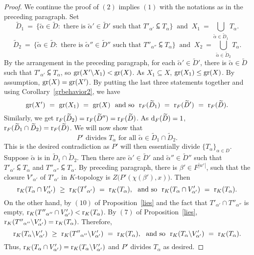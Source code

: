 \begin{proof}
We continue the proof of $(2)$ implies $(1)$ with the notations as in the preceding paragraph. 
Set
$$\widetilde{D}_1\  =\ \{ \tilde{\alpha} \in \widetilde{D} : \text{ there is } \tilde{\alpha}' \in \widetilde{D}' \text{ such that } T'_{\alpha'}\subsim T_\alpha \}\ \text{ and }\ X_1\ =\ \bigcup_{\tilde{\alpha} \in \widetilde{D}_1} T_\alpha. $$
$$\widetilde{D}_2\  =\ \{ \tilde{\alpha} \in \widetilde{D} : \text{ there is } \tilde{\alpha}'' \in \widetilde{D}'' \text{ such that } T''_{\alpha''}\subsim T_\alpha \}\ \text{ and }\ X_2\ =\ \bigcup_{\tilde{\alpha} \in \widetilde{D}_2} T_\alpha. $$
By the arrangement in the preceding paragraph, for each $\tilde{\alpha}' \in \widetilde{D}'$, there is $\tilde{\alpha} \in \widetilde{D}$ such that ${T'}_{\alpha'} \subsim T_\alpha$, so $\mathrm{gr}( X' \backslash X_1) < \mathrm{gr}(X)$. 
 As $X_1 \subseteq X $, $\mathrm{gr}(X_1) \leq \mathrm{gr}(X)$. By assumption, $\mathrm{gr}(X) =\mathrm{gr}(X')$. By putting the last three statements together and using Corollary~\ref{grbehavior2}, we have 
$$\gr( X')\ =\ \gr(X_1)\ =\ \gr(X)\ \text{ and so }\ \mr_F(\widetilde{D}_1)\ =\ \mr_F(\widetilde{D}')\ =\ \mr_F(\widetilde{D}).$$
Similarly, we get $\mathrm{r}_F(\widetilde{D}_2) =\mathrm{r}_F(\widetilde{D}'')=\mathrm{r}_F(\widetilde{D}) $.
As  $\mathrm{d}_F(\widetilde{D})=1$, $\mathrm{r}_F(\widetilde{D}_1 \cap \widetilde{D}_2) = \mathrm{r}_F(\widetilde{D}) $. 
We will now show that 
$$ P' \text{ divides }T_\alpha \text{ for all } \tilde{\alpha} \in \widetilde{D}_1 \cap \widetilde{D}_2. $$
This is the desired contradiction as $P'$ will then essentially divide $\{ T_\alpha\}_{ \alpha \in D}$. Suppose  $\tilde{\alpha} $ is in $\widetilde{D}_1 \cap \widetilde{D}_2$.  
Then there are $\tilde{\alpha}' \in \tilde{D}'$ and $\tilde{\alpha}'' \in \tilde{D}''$ such that ${T'}_{\alpha'} \subsim T_\alpha$ and ${T''}_{\alpha''} \subsim T_\alpha$.
 By preceding paragraph, there is $\beta' \in F^{|w'|}$, such that the closure $V'_{\alpha'}$  of $T'_{\alpha'}$ in $K$-topology is $Z\big(P'(\chi(\beta'),x)\big)$. 
Then $$\mr_K(T_\alpha \cap V'_{\alpha'})\ \geq\ \mr_K({T'}_{\alpha'})\ =\ \mr_K(T_{\alpha}),\ \text{ and so }\ \mr_K(T_\alpha \cap V'_{\alpha'})\ =\ \mr_K(T_{\alpha}).$$ 
On the other hand, by $(10)$ of Proposition~\ref{lies} and the fact that ${T'}_{\alpha'} \cap {T''}_{\alpha''}$ is empty, $\mathrm{r}_K({T''}_{\alpha''} \cap V'_{\alpha'})< \mathrm{r}_K(T_{\alpha})$. By $(7)$ of Proposition~\ref{lies}, $\mathrm{r}_K({T''}_{\alpha''} \backslash V'_{\alpha'}) = \mathrm{r}_K(T_{\alpha})$. 
Therefore, $$\mr_K(T_\alpha \backslash V'_{\alpha'})\ \geq\ \mr_K({T''}_{\alpha''} \backslash V'_{\alpha'})\ =\ \mr_K(T_{\alpha}),\ \text{ and so }\ \mr_K({T}_{\alpha} \backslash V'_{\alpha'})\ =\ \mr_K( T_\alpha).$$
Thus,  $\mathrm{r}_K(T_\alpha \cap V'_{\alpha'}) = \mathrm{r}_K({T}_{\alpha} \backslash V'_{\alpha'})$ and $P'$ divides $T_\alpha$ as desired.
\end{proof}

